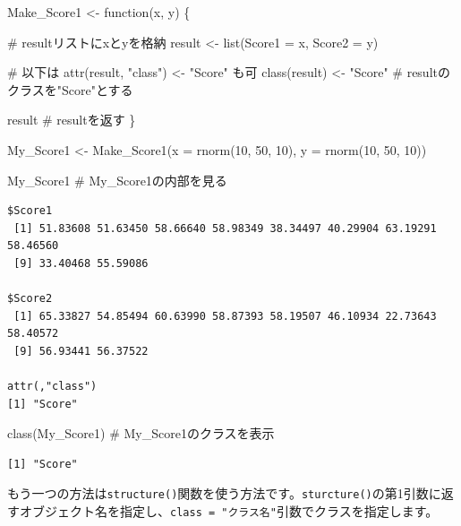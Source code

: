 \documentclass[
  a4paper,
  pandoc,
  ja=standard,
  jafont=haranoaji]{bxjsbook}
\newenvironment{Shaded}{\begin{snugshade}}{\end{snugshade}}
\newcommand{\AttributeTok}[1]{\textcolor[rgb]{0.00,0.48,0.65}{#1}}
\newcommand{\CommentTok}[1]{\textcolor[rgb]{0.37,0.37,0.37}{#1}}
\newcommand{\ControlFlowTok}[1]{\textcolor[rgb]{0.00,0.48,0.65}{#1}}
\newcommand{\DecValTok}[1]{\textcolor[rgb]{0.68,0.00,0.00}{#1}}
\newcommand{\FunctionTok}[1]{\textcolor[rgb]{0.28,0.35,0.67}{#1}}
\newcommand{\NormalTok}[1]{\textcolor[rgb]{0.00,0.48,0.65}{#1}}
\newcommand{\OtherTok}[1]{\textcolor[rgb]{0.00,0.48,0.65}{#1}}
\newcommand{\StringTok}[1]{\textcolor[rgb]{0.13,0.47,0.30}{#1}}
\begin{document}
\begin{Shaded}
\begin{Highlighting}[numbers=left,,]
\NormalTok{Make\_Score1 }\OtherTok{\textless{}{-}} \ControlFlowTok{function}\NormalTok{(x, y) \{}
  
  \CommentTok{\# resultリストにxとyを格納}
\NormalTok{  result }\OtherTok{\textless{}{-}} \FunctionTok{list}\NormalTok{(}\AttributeTok{Score1 =}\NormalTok{ x, }\AttributeTok{Score2 =}\NormalTok{ y)}
  
  \CommentTok{\# 以下は attr(result, "class") \textless{}{-} "Score" も可}
  \FunctionTok{class}\NormalTok{(result) }\OtherTok{\textless{}{-}} \StringTok{"Score"} \CommentTok{\# resultのクラスを"Score"とする}
  
\NormalTok{  result                   }\CommentTok{\# resultを返す}
\NormalTok{\}}

\NormalTok{My\_Score1 }\OtherTok{\textless{}{-}} \FunctionTok{Make\_Score1}\NormalTok{(}\AttributeTok{x =} \FunctionTok{rnorm}\NormalTok{(}\DecValTok{10}\NormalTok{, }\DecValTok{50}\NormalTok{, }\DecValTok{10}\NormalTok{),}
                         \AttributeTok{y =} \FunctionTok{rnorm}\NormalTok{(}\DecValTok{10}\NormalTok{, }\DecValTok{50}\NormalTok{, }\DecValTok{10}\NormalTok{))}

\NormalTok{My\_Score1 }\CommentTok{\# My\_Score1の内部を見る}
\end{Highlighting}
\end{Shaded}

\begin{verbatim}
$Score1
 [1] 51.83608 51.63450 58.66640 58.98349 38.34497 40.29904 63.19291 58.46560
 [9] 33.40468 55.59086

$Score2
 [1] 65.33827 54.85494 60.63990 58.87393 58.19507 46.10934 22.73643 58.40572
 [9] 56.93441 56.37522

attr(,"class")
[1] "Score"
\end{verbatim}

\begin{Shaded}
\begin{Highlighting}[numbers=left,,]
\FunctionTok{class}\NormalTok{(My\_Score1) }\CommentTok{\# My\_Score1のクラスを表示}
\end{Highlighting}
\end{Shaded}

\begin{verbatim}
[1] "Score"
\end{verbatim}

もう一つの方法は\texttt{structure()}関数を使う方法です。\texttt{sturcture()}の第1引数に返すオブジェクト名を指定し、\texttt{class\ =\ "クラス名"}引数でクラスを指定します。
\end{document}
